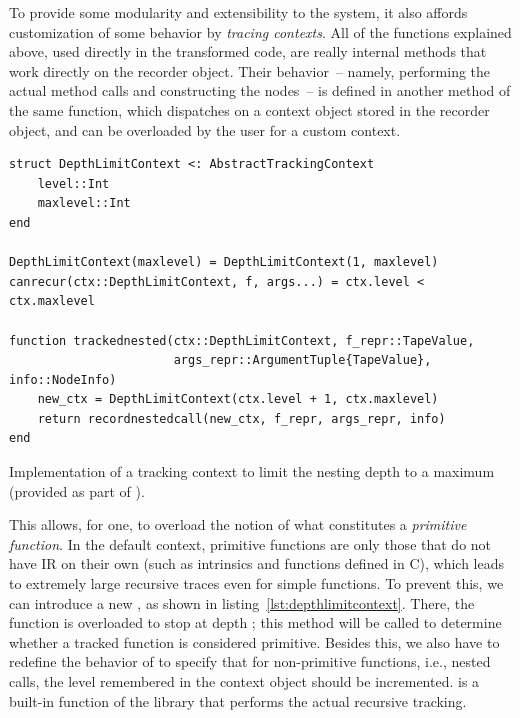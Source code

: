 To provide some modularity and extensibility to the system, it also affords customization of some
behavior by \emph{tracing contexts}.  All of the  functions explained above, used
directly in the transformed code, are really internal methods that work directly on the recorder
object.  Their behavior~-- namely, performing the actual method calls and constructing the nodes~--
is defined in another method of the same function, which dispatches on a context object stored in
the recorder object, and can be overloaded by the user for a custom context.

\begin{lstfloat}
\begin{lstlisting}[style=lstfloat]
struct DepthLimitContext <: AbstractTrackingContext
    level::Int
    maxlevel::Int
end

DepthLimitContext(maxlevel) = DepthLimitContext(1, maxlevel)
canrecur(ctx::DepthLimitContext, f, args...) = ctx.level < ctx.maxlevel

function trackednested(ctx::DepthLimitContext, f_repr::TapeValue,
                       args_repr::ArgumentTuple{TapeValue}, info::NodeInfo)
    new_ctx = DepthLimitContext(ctx.level + 1, ctx.maxlevel)
    return recordnestedcall(new_ctx, f_repr, args_repr, info)
end
\end{lstlisting}
  \caption{Implementation of a tracking context to limit the nesting depth to a maximum (provided as
    part of \irtrackerjl{}).\label{lst:depthlimitcontext}}
\end{lstfloat}

This allows, for one, to overload the notion of what constitutes a \emph{primitive function}.  In
the default context, primitive functions are only those that do not have IR on their own (such as
intrinsics and functions defined in C), which leads to extremely large recursive traces even for
simple functions.  To prevent this, we can introduce a new , as shown in
listing~\ref{lst:depthlimitcontext}.  There, the function  is overloaded to stop at
depth ; this method will be called to determine whether a tracked function is
considered primitive.  Besides this, we also have to redefine the behavior of 
to specify that for non-primitive functions, i.e., nested calls, the level remembered in the context
object should be incremented.   is a built-in function of the library that
performs the actual recursive tracking.


